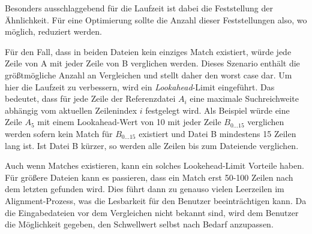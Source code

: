 

Besonders ausschlaggebend für die Laufzeit ist dabei die Feststellung der Ähnlichkeit. Für eine Optimierung sollte die Anzahl dieser Feststellungen also, wo möglich, reduziert werden.

Für den Fall, dass in beiden Dateien kein einziges Match existiert, würde jede Zeile von A mit jeder Zeile von B verglichen werden. Dieses Szenario enthält die größtmögliche Anzahl an Vergleichen und stellt daher den worst case dar. Um hier die Laufzeit zu verbessern, wird ein \textit{Lookahead}-Limit eingeführt. Das bedeutet, dass für jede Zeile der Referenzdatei $A_i$ eine maximale Suchreichweite abhängig vom aktuellen Zeilenindex $i$ festgelegt wird.
Als Beispiel würde eine Zeile $A_5$ mit einem Lookahead-Wert von 10 mit jeder Zeile $B_{0...15}$ verglichen werden sofern kein Match für $B_{0...15}$ existiert und Datei B mindestens 15 Zeilen lang ist. Ist Datei B kürzer, so werden alle Zeilen bis zum Dateiende verglichen. 

Auch wenn Matches existieren, kann ein solches Lookehead-Limit Vorteile haben. Für größere Dateien kann es passieren, dass ein Match erst 50-100 Zeilen nach dem letzten gefunden wird. Dies führt dann zu genauso vielen Leerzeilen im Alignment-Prozess, was die Lesbarkeit für den Benutzer beeinträchtigen kann. Da die Eingabedateien vor dem Vergleichen nicht bekannt sind, wird dem Benutzer die Möglichkeit gegeben, den Schwellwert selbst nach Bedarf anzupassen.

